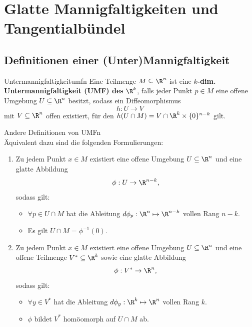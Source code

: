 \section{Glatte Mannigfaltigkeiten und Tangentialbündel}
\label{Mfn}
\subsection{Definitionen einer (Unter)Mannigfaltigkeit}
\label{subsec:Umfn}
\begin{definition}{Untermannigfaltigkeit}{umfn}
Eine Teilmenge $M \subseteq \R^n$ ist eine $k$\textbf{-dim. Untermannigfaltigkeit (UMF) des }$\R^k$, falls jeder Punkt $p \in M$ eine offene Umgebung $U \subseteq \R^n$ besitzt, sodass ein Diffeomorphismus
\begin{equation}
h: U \to V 
\end{equation}
mit $V \subseteq \R^n$ offen existiert, für den $h(U \cap M) = V \cap \R^k \times \{0\}^{n-k}$ gilt.
\end{definition}
\begin{bemerkungen}{Andere Definitionen von UMFn}\\
Äquivalent dazu sind die folgenden Formulierungen:
\begin{enumerate}
\item Zu jedem Punkt $x \in M$ existiert eine offene Umgebung $U \subseteq \R^n$ und eine glatte Abbildung 
\begin{equation}
\phi: U \to \R^{n-k},
\end{equation}
sodass gilt:
\begin{itemize}
\item $\forall p \in U \cap M$ hat die Ableitung $d\phi_p: \R^n \mapsto \R^{n-k}$ vollen Rang $n-k$.
\item Es gilt $U \cap M = \phi^{-1}(0)$.
\end{itemize}
\item Zu jedem Punkt $x \in M$ existiert eine offene Umgebung $U \subseteq \R^n$ und eine offene Teilmenge $V^* \subseteq \R^k$ sowie eine glatte Abbildung 
\begin{equation}
\phi: V^* \to \R^n,
\end{equation}
sodass gilt:
\begin{itemize}
\item $\forall y \in V^*$ hat die Ableitung $d\phi_y: \R^k \mapsto \R^n$ vollen Rang $k$.
\item $\phi$ bildet $V^*$ homöomorph auf $U \cap M$ ab.
\end{itemize}
\end{enumerate}
\end{bemerkungen} 
